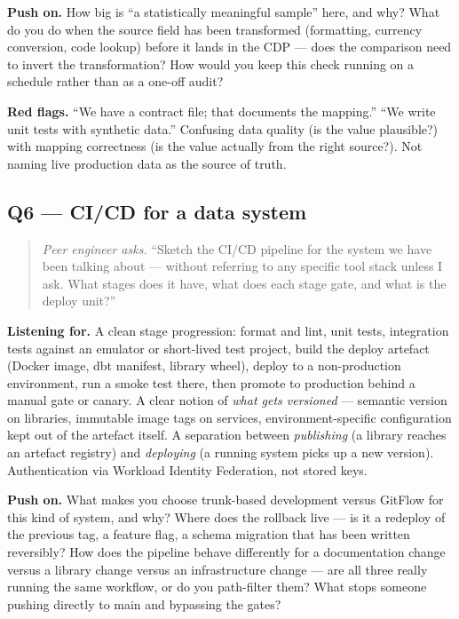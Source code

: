 \documentclass[
  11pt,
  british,
  oneside]{book}
\begin{document}
\textbf{Push on.} How big is ``a statistically meaningful sample'' here,
and why? What do you do when the source field has been transformed
(formatting, currency conversion, code lookup) before it lands in the
CDP --- does the comparison need to invert the transformation? How would
you keep this check running on a schedule rather than as a one-off
audit?

\textbf{Red flags.} ``We have a contract file; that documents the
mapping.'' ``We write unit tests with synthetic data.'' Confusing data
quality (is the value plausible?) with mapping correctness (is the value
actually from the right source?). Not naming live production data as the
source of truth.

\hypertarget{q6-cicd-for-a-data-system}{%
\subsection{Q6 --- CI/CD for a data
system}\label{q6-cicd-for-a-data-system}}

\begin{quote}
\emph{Peer engineer asks.} ``Sketch the CI/CD pipeline for the system we
have been talking about --- without referring to any specific tool stack
unless I ask. What stages does it have, what does each stage gate, and
what is the deploy unit?''
\end{quote}

\textbf{Listening for.} A clean stage progression: format and lint, unit
tests, integration tests against an emulator or short-lived test
project, build the deploy artefact (Docker image, dbt manifest, library
wheel), deploy to a non-production environment, run a smoke test there,
then promote to production behind a manual gate or canary. A clear
notion of \emph{what gets versioned} --- semantic version on libraries,
immutable image tags on services, environment-specific configuration
kept out of the artefact itself. A separation between \emph{publishing}
(a library reaches an artefact registry) and \emph{deploying} (a running
system picks up a new version). Authentication via Workload Identity
Federation, not stored keys.

\textbf{Push on.} What makes you choose trunk-based development versus
GitFlow for this kind of system, and why? Where does the rollback live
--- is it a redeploy of the previous tag, a feature flag, a schema
migration that has been written reversibly? How does the pipeline behave
differently for a documentation change versus a library change versus an
infrastructure change --- are all three really running the same
workflow, or do you path-filter them? What stops someone pushing
directly to main and bypassing the gates?
\end{document}
